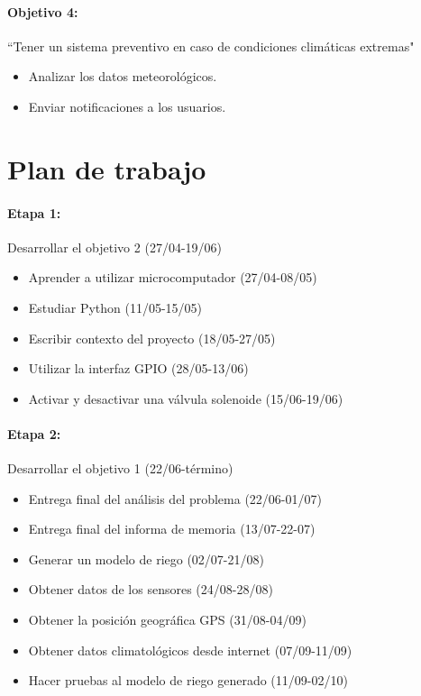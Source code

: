\documentclass[11pt,letterpaper]{article}
\begin{document}
\paragraph{Objetivo 4:} ``Tener un sistema preventivo en caso de condiciones climáticas extremas"\\
\begin{itemize}
\item Analizar los datos meteorológicos.
\item Enviar notificaciones a los usuarios.
\end{itemize}


\section{Plan de trabajo}

\paragraph{Etapa 1:} Desarrollar el objetivo 2 (27/04-19/06)
\begin{itemize}
\item Aprender a utilizar microcomputador (27/04-08/05)
\item Estudiar Python (11/05-15/05)
\item Escribir contexto del proyecto (18/05-27/05)
\item Utilizar la interfaz GPIO (28/05-13/06)
\item Activar y desactivar una válvula solenoide (15/06-19/06)
\end{itemize}

\paragraph{Etapa 2:} Desarrollar el objetivo 1 (22/06-término)
\begin{itemize}
\item Entrega final del análisis del problema (22/06-01/07)
\item Entrega final del informa de memoria (13/07-22-07)
\item Generar un modelo de riego (02/07-21/08)
\item Obtener datos de los sensores (24/08-28/08)
\item Obtener la posición geográfica GPS (31/08-04/09)
\item Obtener datos climatológicos desde internet (07/09-11/09)
\item Hacer pruebas al modelo de riego generado (11/09-02/10)
\end{itemize}
\end{document}
